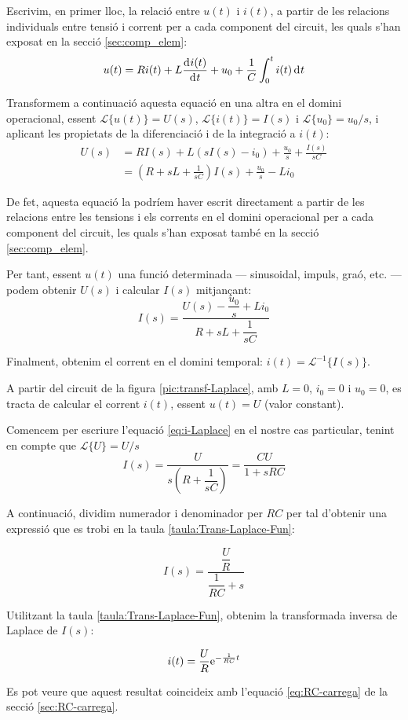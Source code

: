 Escrivim, en primer lloc,  la relació entre $u(t)$ i $i(t)$, a partir
de les relacions individuals entre tensió i corrent per a cada
component del circuit, les quals s'han exposat en la secció
\vref{sec:comp_elem}:
\begin{equation}
    u(t) = R i(t) + L \frac{\diff i(t)}{\diff t} + u_0 + \frac{1}{C}
    \int_0^t i(t) \diff t
\end{equation}

Transformem a continuació aquesta equació en una altra en el domini
operacional, essent $\mathscr{L}\{u(t)\} = U(s)$,
$\mathscr{L}\{i(t)\} = I(s)$ i $\mathscr{L}\{u_0\} =
u_0/s$, i aplicant les propietats de la diferenciació i de la
integració a $i(t)$:
\begin{equation}\begin{split}
    U(s) &= R I(s) + L(s I(s) -i_0) + \frac{u_0}{s} + \frac{I(s)}{s
    C} \\[1ex]
    &= \left( R + s L +\frac{1}{s C}\right)I(s) + \frac{u_0}{s} - L i_0
\end{split}\end{equation}

De fet, aquesta equació la podríem haver escrit directament a
partir de les relacions entre les tensions i els corrents en el
domini operacional per a cada  component del circuit, les quals
s'han exposat també en la secció \vref{sec:comp_elem}.

Per tant, essent $u(t)$  una funció determinada  --- sinusoidal, impuls,
graó, etc. --- podem obtenir $U(s)$ i calcular $I(s)$ mitjançant:
\begin{equation}
    I(s) = \frac{U(s)-\dfrac{u_0}{s} + L i_0}{R + s L
    +\dfrac{1}{s C}}\label{eq:i-Laplace}
\end{equation}

Finalment, obtenim el corrent en el domini temporal: $i(t) =
\mathscr{L}^{-1}\{I(s)\}$.

	
\begin{exemple}[\ResCircRC{}]
	\addcontentsxms{\ResCircRC}
    A partir del circuit de la figura \vref{pic:transf-Laplace}, amb
    $L=0$, $i_0=0$ i $u_0=0$, es tracta de calcular el corrent $i(t)$,
    essent $u(t)=U$ (valor constant).

    Comencem per escriure l'equació \eqref{eq:i-Laplace} en el nostre
    cas particular, tenint en compte que $\mathscr{L}\{U\} = U/s$
    \[
        I(s) = \frac{U}{s\left(R + \dfrac{1}{s C}\right)} = \frac{C U}{1 + s R C}
    \]

    A continuació, dividim numerador i denominador per $R C$ per tal
    d'obtenir una expressió que es trobi en la taula
    \vref{taula:Trans-Laplace-Fun}:

    \[
        I(s) = \frac{\dfrac{U}{R}}{\dfrac{1}{R C} + s}
    \]

    Utilitzant la taula \vref{taula:Trans-Laplace-Fun}, obtenim la transformada inversa de Laplace de $I(s)$:

    \[
        i(t) = \frac{U}{R} \mathrm{e}^{-\frac{1}{R C}t}
    \]

    Es pot veure que aquest resultat coincideix amb l'equació \eqref{eq:RC-carrega} de la secció \vref{sec:RC-carrega}.
\end{exemple}

